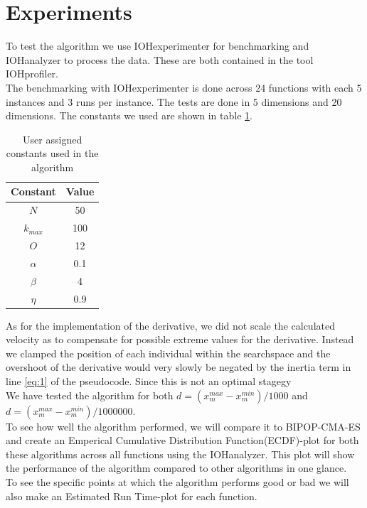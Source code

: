 \documentclass[runningheads]{llncs}
\begin{document}
\section{Experiments}
To test the algorithm we use IOHexperimenter for benchmarking and IOHanalyzer to process the data. These are both contained in the tool IOHprofiler\cite{IOHprofiler}.\\
The benchmarking with IOHexperimenter is done across 24 functions with each 5 instances and 3 runs per instance. The tests are done in 5 dimensions and 20 dimensions. The constants we used are shown in table \ref{tab:constants}.
\begin{table}[h!]
    \centering
    \begin{tabular}{c|c}
        Constant & Value \\ \hline \hline
        $N$ & 50\\\hline
        $k_{max}$ & 100\\\hline
        $O$ & 12 \\\hline
        $\alpha$ & 0.1 \\\hline
        $\beta$ & 4 \\\hline
        $\eta$ & 0.9
        \end{tabular}
    \caption{User assigned constants used in the algorithm}
    \label{tab:constants}
\end{table}{}

As for the implementation of the derivative, we did not scale the calculated velocity as to compensate for possible extreme values for the derivative. Instead we clamped the position of each individual within the searchspace and the overshoot of the derivative would very slowly be negated by the inertia term in line \ref{eq:1} of the pseudocode. Since this is not an optimal stagegy\\
We have tested the algorithm for both $d = (x_m^{max}-x_m^{min})/1000$ and $d = (x_m^{max}-x_m^{min})/1000000$.\\

To see how well the algorithm performed, we will compare it to BIPOP-CMA-ES\cite{COCOperformace} and create an Emperical Cumulative Distribution Function(ECDF)-plot for both these algorithms across all functions using the IOHanalyzer. This plot will show the performance of the algorithm compared to other algorithms in one glance.\\
To see the specific points at which the algorithm performs good or bad we will also make an Estimated Run Time-plot for each function.\\
\end{document}
